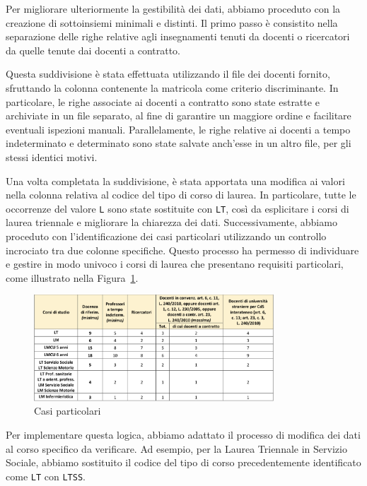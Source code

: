 Per migliorare ulteriormente la gestibilità dei dati, abbiamo proceduto con la creazione 
di sottoinsiemi minimali e distinti. Il primo passo è consistito nella separazione delle 
righe relative agli insegnamenti tenuti da docenti o ricercatori da quelle tenute dai 
docenti a contratto.

Questa suddivisione è stata effettuata utilizzando il file dei docenti fornito, 
sfruttando la colonna contenente la matricola come criterio discriminante. In particolare, 
le righe associate ai docenti a contratto sono state estratte e archiviate in un file separato, 
al fine di garantire un maggiore ordine e facilitare eventuali ispezioni manuali. 
Parallelamente, le righe relative ai docenti a tempo indeterminato e determinato sono 
state salvate anch'esse in un altro file, per gli stessi identici motivi.

Una volta completata la suddivisione, è stata apportata una modifica ai valori nella colonna 
relativa al codice del tipo di corso di laurea. In particolare, tutte le occorrenze del 
valore \texttt{L} sono state sostituite con \texttt{LT}, così da esplicitare i corsi di 
laurea triennale e migliorare la chiarezza dei dati. Successivamente, abbiamo proceduto con 
l'identificazione dei casi particolari utilizzando un controllo incrociato tra due colonne 
specifiche. Questo processo ha permesso di individuare e gestire in modo univoco i corsi 
di laurea che presentano requisiti particolari, come illustrato nella 
Figura~\ref{fig:casi_particolari}.

\begin{figure}[h]
    \centering
    \includegraphics[width=0.8\textwidth]{./images/tabellaministeriale.png}
    \caption{Casi particolari}
    \label{fig:casi_particolari}
\end{figure}

Per implementare questa logica, abbiamo adattato il processo di modifica dei dati al corso 
specifico da verificare. Ad esempio, per la Laurea Triennale in Servizio Sociale, abbiamo 
sostituito il codice del tipo di corso precedentemente identificato come \texttt{LT} con 
\texttt{LTSS}.

